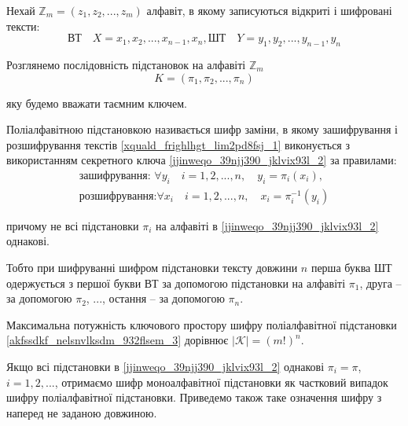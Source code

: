 Нехай $\mathbb{Z}_m = (z_1, z_2, ..., z_m)$ алфавіт, в якому записуються відкриті і
шифровані тексти:
\begin{equation}
\label{xquald_frighlhgt_lim2pd8fsj_1}
    \text{ВТ} \quad X = x_1, x_2, ..., x_{n-1}, x_n,
    \text{ШТ} \quad Y = y_1, y_2, ..., y_{n-1}, y_n
\end{equation}

Розглянемо послідовність підстановок на алфавіті $\mathbb{Z}_m$
\begin{equation}
    \label{jjinweqo_39njj390_jklvix93l_2}
    K = (\pi_1, \pi_2, ..., \pi_n)
\end{equation}

яку будемо вважати таємним ключем.

\begin{definition}
    \label{def_lfsdjljfs_sdlfnewco_ljas1}
    Поліалфавітною підстановкою називається шифр заміни, в
    якому зашифрування і розшифрування текстів \ref{xquald_frighlhgt_lim2pd8fsj_1}
    виконується з використанням секретного ключа \ref{jjinweqo_39njj390_jklvix93l_2}
    за правилами:
    \begin{equation}
        \label{akfssdkf_nelsnvlksdm_932flsem_3}
        \begin{array}{l}
            \text{зашифрування: } \forall y_i \quad i = 1, 2, ..., n, \quad y_i = \pi_i(x_i), \\
            \text{розшифрування:} \forall x_i \quad i = 1, 2, ..., n, \quad x_i = \pi_i^{-1}(y_i)
        \end{array}
    \end{equation}
    
    причому не всі підстановки $\pi_i$ на алфавіті в
    \ref{jjinweqo_39njj390_jklvix93l_2} однакові.
\end{definition}

Тобто при шифруванні шифром підстановки тексту довжини $n$ перша
буква ШТ одержується з першої букви ВТ за допомогою підстановки на
алфавіті $\pi_1$, друга – за допомогою $\pi_2$, ..., остання – за допомогою $\pi_n$.

Максимальна потужність ключового простору шифру поліалфавітної
підстановки \ref{akfssdkf_nelsnvlksdm_932flsem_3} дорівнює $|\mathcal{K}| = (m!)^n$.

Якщо всі підстановки в \ref{jjinweqo_39njj390_jklvix93l_2} однакові
$\pi_i = \pi$, $i = 1, 2, ...$, отримаємо шифр
моноалфавітної підстановки як частковий випадок шифру поліалфавітної
підстановки. Приведемо також таке означення шифру з наперед не заданою
довжиною.

